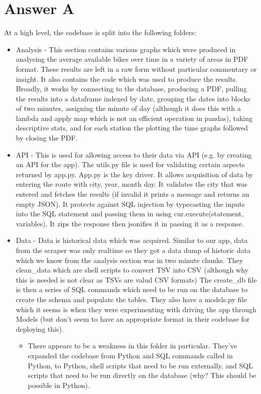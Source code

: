 \documentclass{scrreprt}
\begin{document}
\section{Answer A}\label{AA}
At a high level, the codebase is split into the following folders:
\begin{itemize}
	\item Analysis - This section contains various graphs which were produced in analysing the average available bikes over time in a variety of areas in PDF format. These results are left in a raw form without particular commentary or insight. It also contains the code which was used to produce the results. Broadly, it works by connecting to the database, producing a PDF, pulling the results into a dataframe indexed by date, grouping the dates into blocks of two minutes, assigning the minute of day (although it does this with a lambda and apply map which is not an efficient operation in pandas), taking descriptive stats, and for each station the plotting the time graphs followed by closing the PDF.
	\item API - This is used for allowing access to their data via API (e.g. by creating an API for the app). The utils.py file is used for validating certain aspects returned by app.py. App.py is the key driver. It allows acquisition of data by entering the route with city, year, month day. It validates the city that was entered and fetches the results (if invalid it prints a message and returns an empty JSON). It protects against SQL injection by typecasting the inputs into the SQL statement and passing them in using cur.execute(statement, variables). It zips the response then jsonifies it in passing it as a response.
	\item Data - Data is historical data which was acquired. Similar to our app, data from the scraper was only realtime so they got a data dump of historic data which we know from the analysis section was in two minute chunks. They clean\_data which are shell scripts to convert TSV into CSV (although why this is needed is not clear as TSVs are valud CSV formats) The create\_db file is then a series of SQL commands which need to be run on the database to create the schema and populate the tables. They also have a models.py file which it seems is when they were experimenting with driving the app through Models (but don't seem to have an appropriate format in their codebase for deploying this).
		\begin{itemize}
			\item There appears to be a weakness in this folder in particular. They've expanded the codebase from Python and SQL commands called in Python, to Python, shell scripts that need to be run externally, and SQL scripts that need to be run directly on the database (why? This should be possible in Python).

\end{itemize}
\end{itemize}
\end{document}

